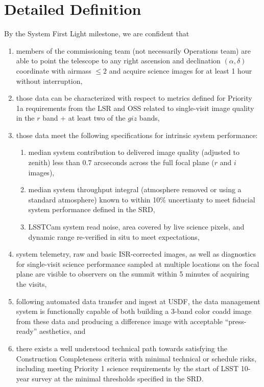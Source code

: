 \documentclass[SE,authoryear,toc,lsstdraft]{lsstdoc}
\begin{document}
\section{Detailed Definition}

By the System First Light milestone, we are confident that

\begin{enumerate}
  \item members of the commissioning team (not necessarily Operations team) are able to point the telescope to any right ascension and declination $(\alpha, \delta)$ coordinate with airmass $\leq 2$ and acquire science images for at least 1 hour without interruption,
  \item those data can be characterized with respect to metrics defined for Priority 1a requirements from the LSR  and OSS  related to single-visit image quality in the $r$ band + at least two of the $giz$ bands,
  \item those data meet the following specifications for intrinsic system performance:
  \begin{enumerate}
    \item median system contribution to delivered image quality (adjusted to zenith) less than 0.7 arcseconds across the full focal plane ($r$ and $i$ images),
    \item median system throughput integral (atmosphere removed or using a standard atmosphere) known to within 10\% uncertianty to meet fiducial system performance defined in the SRD,
    \item LSSTCam system read noise, area covered by live science pixels, and dynamic range re-verified in situ to meet expectations,
  \end{enumerate}
  \item system telemetry, raw and basic ISR-corrected images, as well as diagnostics for single-visit science performance sampled at multiple locations on the focal plane are visible to observers on the summit within 5 minutes of acquiring the visits,
  \item following automated data transfer and ingest at USDF, the data management system is functionally capable of both building a 3-band color coadd image from these data and producing a difference image with acceptable ``press-ready'' aesthetics, and
  \item there exists a well understood technical path towards satisfying the Construction Completeness criteria with minimal technical or schedule risks, including meeting Priority 1 science requirements by the start of LSST 10-year survey at the minimal thresholds specified in the SRD.
\end{enumerate}
\end{document}
